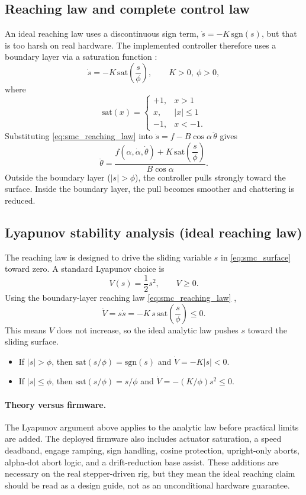 \subsection{Reaching law and complete control law}
An ideal reaching law uses a discontinuous sign term, $\dot{s}=-K\,\mathrm{sgn}(s)$, but that is too harsh on real hardware. The implemented controller therefore uses a boundary layer via a saturation function \cite{utkin1992,slotine1991,Young1999}:
\begin{equation}
\dot{s} = -K\,\mathrm{sat}\!\left(\frac{s}{\phi}\right),\qquad K>0,\ \phi>0,
\label{eq:smc_reaching_law}
\end{equation}
where
\[
\mathrm{sat}(x)=
\begin{cases}
 +1, & x>1\\
 x, & |x|\le 1\\
 -1, & x<-1.
\end{cases}
\]
Substituting \eqref{eq:smc_reaching_law} into $\dot{s}=f-B\cos\alpha\,\ddot{\theta}$ gives
\begin{equation}
\ddot{\theta}
=
\frac{f(\alpha,\dot{\alpha},\dot{\theta}) + K\,\mathrm{sat}\!\left(\dfrac{s}{\phi}\right)}{B\cos\alpha}.
\label{eq:smc_control_law}
\end{equation}
Outside the boundary layer ($|s|>\phi$), the controller pulls strongly toward the surface. Inside the boundary layer, the pull becomes smoother and chattering is reduced.

\subsection{Lyapunov stability analysis (ideal reaching law)}
The reaching law is designed to drive the sliding variable $s$ in \eqref{eq:smc_surface} toward zero. A standard Lyapunov choice is
\[
V(s)=\frac{1}{2}s^2,\qquad V\ge 0.
\]
Using the boundary-layer reaching law \eqref{eq:smc_reaching_law} \cite{utkin1992,slotine1991,Young1999},
\[
\dot{V}=s\dot{s}=-K\,s\,\mathrm{sat}\!\left(\frac{s}{\phi}\right)\le 0.
\]
This means $V$ does not increase, so the ideal analytic law pushes $s$ toward the sliding surface.
\begin{itemize}
  \item If $|s|>\phi$, then $\mathrm{sat}(s/\phi)=\mathrm{sgn}(s)$ and $\dot{V}=-K|s|<0$.
  \item If $|s|\le\phi$, then $\mathrm{sat}(s/\phi)=s/\phi$ and $\dot{V}=-(K/\phi)s^2\le 0$.
\end{itemize}

\paragraph{Theory versus firmware.}
The Lyapunov argument above applies to the analytic law before practical limits are added. The deployed firmware also includes actuator saturation, a speed deadband, engage ramping, sign handling, cosine protection, upright-only aborts, alpha-dot abort logic, and a drift-reduction base assist. These additions are necessary on the real stepper-driven rig, but they mean the ideal reaching claim should be read as a design guide, not as an unconditional hardware guarantee.


